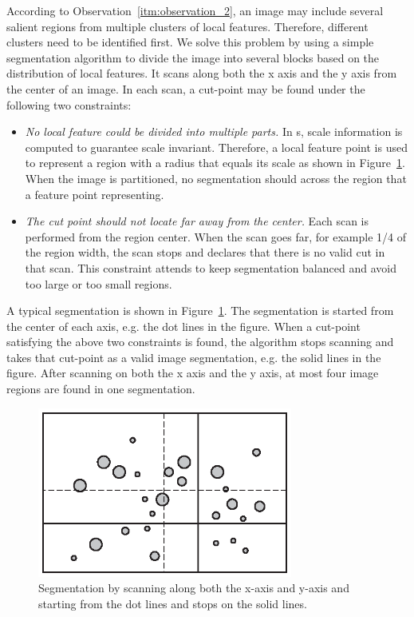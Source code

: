 According to Observation~\ref{itm:observation_2}, an image may include several salient regions from multiple clusters of local features. Therefore, different clusters need to be identified first. We solve this problem by using a simple segmentation algorithm to divide the image into several blocks based on the distribution of local features. It scans along both the x axis and the y axis from the center of an image. In each scan, a cut-point may be found under the following two constraints:

\begin{itemize}
\item \textit{No local feature could be divided into multiple parts.} In {\lfea}s, scale information is computed to guarantee scale invariant. Therefore, a local feature point is used to represent a region with a radius that equals its scale as shown in Figure~\ref{fig:segmentation}. When the image is partitioned, no segmentation should across the region that a feature point representing.

\item \textit{The cut point should not locate far away from the center.} Each scan is performed from the region center. When the scan goes far, for example 1/4 of the region width, the scan stops and declares that there is no valid cut in that scan. This constraint attends to keep segmentation balanced and avoid too large or too small regions.
\end{itemize}

A typical segmentation is shown in Figure~\ref{fig:segmentation}. The segmentation is started from the center of each axis, e.g. the dot lines in the figure. When a cut-point satisfying the above two constraints is found, the algorithm stops scanning and takes that cut-point as a valid image segmentation, e.g. the solid lines in the figure. After scanning on both the x axis and the y axis, at most four image regions are found in one segmentation.

\begin{figure}[!ht]
\centering
\includegraphics[width=3.3in]{images/fig-segmentation.eps}
\caption{Segmentation by scanning along both the x-axis and y-axis and starting from the dot lines and stops on the solid lines.}
\label{fig:segmentation}
\end{figure}

